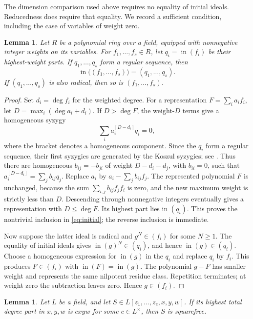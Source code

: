 \documentclass[11pt]{article}
\newtheorem{lemma}[theorem]{Lemma}
\theoremstyle{remark}
\DeclareMathOperator{\htop}{in}
\numberwithin{equation}{section}
\begin{document}
The dimension comparison used above requires no equality of initial
ideals. Reducedness does require that equality. We record a sufficient
condition, including the case of variables of weight zero.

\begin{lemma}\label{lem:filtered}
Let $R$ be a polynomial ring over a field, equipped with nonnegative
integer weights on its variables. For $f_1,\ldots,f_s\in R$, let
$q_i=\htop(f_i)$ be their highest-weight parts. If
$q_1,\ldots,q_s$ form a regular sequence, then
\begin{equation}\label{eq:initial}
 \htop\bigl((f_1,\ldots,f_s)\bigr)=(q_1,\ldots,q_s).
\end{equation}
If $(q_1,\ldots,q_s)$ is also radical, then so is
$(f_1,\ldots,f_s)$.
\end{lemma}

\begin{proof}
Set $d_i=\deg f_i$ for the weighted degree. For a representation
$F=\sum_i a_if_i$, let $D=\max_i(\deg a_i+d_i)$.
If $D>\deg F$, the weight-$D$ terms give a homogeneous syzygy
\[
 \sum_i a_i^{[D-d_i]}q_i=0,
\]
where the bracket denotes a homogeneous component. Since the $q_i$
form a regular sequence, their first syzygies are generated by the
Koszul syzygies; see \cite[Tag 062D]{Stacks}. Thus there are
homogeneous $b_{ij}=-b_{ji}$ of weight $D-d_i-d_j$, with $b_{ii}=0$,
such that
$a_i^{[D-d_i]}=\sum_jb_{ij}q_j$.
Replace $a_i$ by $a_i-\sum_jb_{ij}f_j$.
The represented polynomial $F$ is unchanged, because the sum
$\sum_{i,j}b_{ij}f_jf_i$ is zero, and the new maximum weight is
strictly less than $D$. Descending through nonnegative integers
eventually gives a representation with $D\leq\deg F$.
Its highest part lies in $(q_i)$. This proves the nontrivial inclusion
in \eqref{eq:initial}; the reverse inclusion is immediate.

Now suppose the latter ideal is radical and $g^N\in(f_i)$ for some
$N\geq1$. The equality of initial ideals gives
$\htop(g)^N\in(q_i)$, and hence $\htop(g)\in(q_i)$.
Choose a homogeneous expression for $\htop(g)$ in the $q_i$ and
replace $q_i$ by $f_i$. This produces $F\in(f_i)$ with
$\htop(F)=\htop(g)$. The polynomial $g-F$ has smaller weight and
represents the same nilpotent residue class. Repetition terminates;
at weight zero the subtraction leaves zero. Hence $g\in(f_i)$.
\end{proof}

\begin{lemma}\label{lem:squarefree}
Let $L$ be a field, and let $S\in L[z_1,\ldots,z_e,x,y,w]$.
If its highest total degree part in $x,y,w$ is $cxyw$ for some
$c\in L^\times$, then $S$ is squarefree.
\end{lemma}
\end{document}
